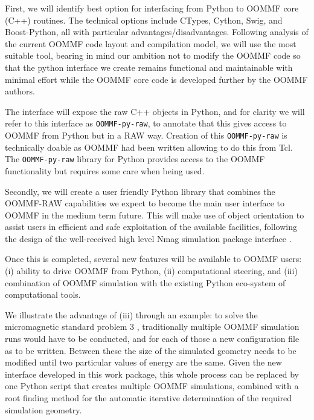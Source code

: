 \begin{workpackage}
\begin{tasklist}
\begin{task}[lead=USO,id=oommf-python-interface,title=OOMMF case study: Create Python interface to OOMMF code,PM=6]

  First, we will identify best option for interfacing from Python to OOMMF
  core (C++) routines. The technical options include CTypes, Cython, Swig,
  and Boost-Python, all with particular
  advantages/disadvantages. Following analysis of the current OOMMF
  code layout and compilation model, we will use the most suitable
  tool, bearing in mind our ambition not to modify the OOMMF code so
  that the python interface we create remains functional and
  maintainable with minimal effort while the OOMMF core code is
  developed further by the OOMMF authors.

  The interface will expose the raw C++ objects in Python, and for
  clarity we will refer to this interface as \texttt{OOMMF-py-raw}, to
  annotate that this gives access to OOMMF from Python but in a RAW
  way. Creation of this \texttt{OOMMF-py-raw} is technically doable as
  OOMMF had been written allowing to do this from Tcl. The
  \texttt{OOMMF-py-raw} library for Python provides access to the
  OOMMF functionality but requires some care when being used.

  Secondly, we will create a user friendly Python library that
  combines the OOMMF-RAW capabilities we expect to become the main
  user interface to OOMMF in the medium term future. This will make
  use of object orientation to assist users in efficient and safe
  exploitation of the available facilities, following the design of
  the well-received high level Nmag simulation package
  \cite{Fischbacher2007a} interface \cite{Nmag-url}.

  Once this is completed, several new features will be available to
  OOMMF users: (i) ability to drive OOMMF from Python, (ii)
  computational steering, and (iii) combination of OOMMF simulation
  with the existing Python eco-system of computational tools.


  We illustrate the advantage of (iii) through an example: to solve
  the micromagnetic standard problem 3
  \cite{Micromagnetic-Standardproblem-3}, traditionally multiple OOMMF
  simulation runs would have to be conducted, and for each of those a
  new configuration file as to be written. Between these the size of
  the simulated geometry needs to be modified until two particular
  values of energy are the same. Given the new interface developed in
  this work package, this whole process can be replaced by one Python
  script that creates multiple OOMMF simulations, combined with a root
  finding method for the automatic iterative determination of the
  required simulation geometry.


\end{task}
\end{tasklist}
\end{workpackage}
